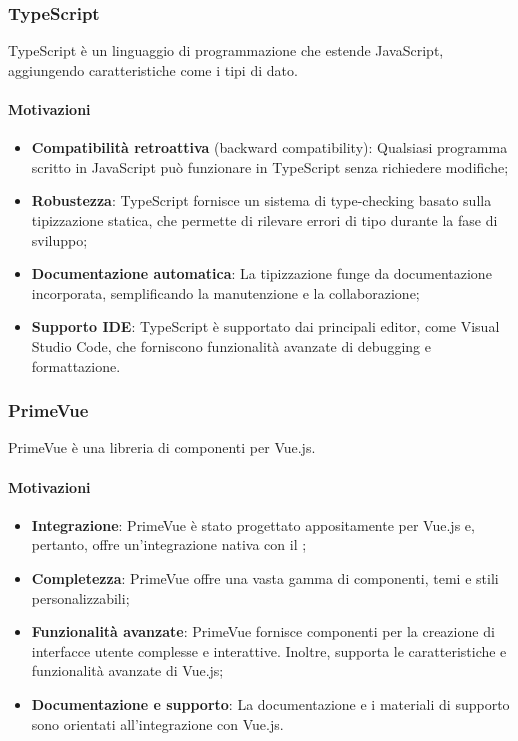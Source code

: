 \subsubsection{TypeScript}\label{sec:typescript}
\par TypeScript è un linguaggio di programmazione che estende JavaScript, aggiungendo caratteristiche come i tipi di dato.
\paragraph*{Motivazioni}
\begin{itemize}
  \item \textbf{Compatibilità retroattiva} (backward compatibility): Qualsiasi programma scritto in JavaScript può funzionare in TypeScript senza richiedere modifiche;
  \item \textbf{Robustezza}: TypeScript fornisce un sistema di type-checking basato sulla tipizzazione statica, che permette di rilevare errori di tipo durante la fase di sviluppo;
  \item \textbf{Documentazione automatica}: La tipizzazione funge da documentazione incorporata, semplificando la manutenzione e la collaborazione;
  \item \textbf{Supporto IDE}: TypeScript è supportato dai principali editor, come Visual Studio Code, che forniscono funzionalità avanzate di debugging e formattazione.
\end{itemize}

\subsubsection{PrimeVue}\label{sec:primevue}
\par PrimeVue è una libreria di componenti per Vue.js.
\paragraph*{Motivazioni}
\begin{itemize}
  \item \textbf{Integrazione}: PrimeVue è stato progettato appositamente per Vue.js e, pertanto, offre un'integrazione nativa con il ;
  \item \textbf{Completezza}: PrimeVue offre una vasta gamma di componenti, temi e stili personalizzabili;
  \item \textbf{Funzionalità avanzate}: PrimeVue fornisce componenti per la creazione di interfacce utente complesse e interattive. Inoltre, supporta le caratteristiche e funzionalità avanzate di Vue.js;
  \item \textbf{Documentazione e supporto}: La documentazione e i materiali di supporto sono orientati all'integrazione con Vue.js.
\end{itemize}

